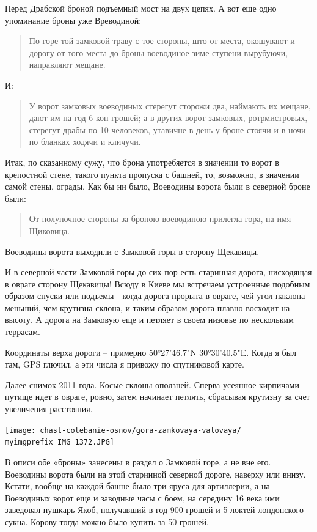 Перед Драбской броной подъемный мост на двух цепях. А вот еще одно упоминание броны уже Вреводиной:

\begin{quotation}
По горе той замковой траву с тое стороны, што от места, окошувают и дорогу от того места до броны воеводиное зиме ступени вырубуючи, направляют мещане.
\end{quotation}

И:

\begin{quotation}
У ворот замковых воеводиных стерегут сторожи два, наймають их мещане, дают им на год 6 коп грошей; а в других ворот замковых, ротрмистровых, стерегут драбы по 10 человеков, утавичне в день у броне стоячи и в ночи по бланках ходячи и кличучи.
\end{quotation}

Итак, по сказанному сужу, что брона употребяется в значении то ворот в крепостной стене, такого пункта пропуска с башней, то, возможно, в значении самой стены, ограды. Как бы ни было, Воеводины ворота были в северной броне были:

\begin{quotation}
От полуночное стороны за броною воеводиною прилегла гора, на имя Щиковица.\end{quotation}


Воеводины ворота выходили с Замковой горы в сторону Щекавицы.

И в северной части Замковой горы до сих пор есть старинная дорога, нисходящая в овраге сторону Щекавицы! Всюду в Киеве мы встречаем  устроенные подобным образом спуски или подъемы - когда дорога прорыта в овраге, чей угол наклона меньший, чем крутизна склона, и таким образом дорога плавно восходит на высоту. А дорога на Замковую еще и петляет в своем низовье по нескольким террасам.

Координаты верха дороги – примерно 50°27'46.7"N 30°30'40.5"E. Когда я был там, GPS глючил, а эти числа я привожу по спутниковой карте.

Далее снимок 2011 года. Косые склоны оползней. Сперва усеянное кирпичами путище идет в овраге, ровно, затем начинает петлять, сбрасывая крутизну за счет увеличения расстояния.

\begin{center}
\texttt{[image: chast-colebanie-osnov/gora-zamkovaya-valovaya/\\myimgprefix IMG\_1372.JPG]}
\end{center}

В описи обе «броны» занесены в раздел о Замковой горе, а не вне его. Воеводины ворота были на этой старинной северной дороге, наверху или внизу. Кстати, вообще на каждой башне было три яруса для артиллерии, а на Воеводиных ворот еще и заводные часы с боем, на середину 16 века ими заведовал пушкарь Якоб, получавший в год 900 грошей и 5 локтей лондонского сукна. Корову тогда можно было купить за 50 грошей.

